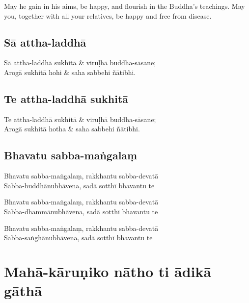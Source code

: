 \begin{english}
  May he gain in his aims, be happy, and flourish in the Buddha's teachings. May
  you, together with all your relatives, be happy and free from disease.
\end{english}

\subsection{Sā attha-laddhā}


\begin{twochants}
Sā attha-laddhā sukhitā & viruḷhā buddha-sāsane;\\
Arogā sukhitā hohi & saha sabbehi ñātibhi.\\
\end{twochants}

\subsection{Te attha-laddhā sukhitā}
\label{te-attha-laddha}


\begin{twochants}
Te attha-laddhā sukhitā & viruḷhā buddha-sāsane;\\
Arogā sukhitā hotha & saha sabbehi ñātibhi.
\end{twochants}


\subsection{Bhavatu sabba-maṅgalaṃ}
\label{bhavatu}


Bhavatu sabba-maṅgalaṃ, rakkhantu sabba-devatā\\
Sabba-buddhānubhāvena, sadā sotthī bhavantu te

Bhavatu sabba-maṅgalaṃ, rakkhantu sabba-devatā\\
Sabba-dhammānubhāvena, sadā sotthī bhavantu te

Bhavatu sabba-maṅgalaṃ, rakkhantu sabba-devatā\\
Sabba-saṅghānubhāvena, sadā sotthī bhavantu te

\section{Mahā-kāruṇiko nātho ti ādikā gāthā}

